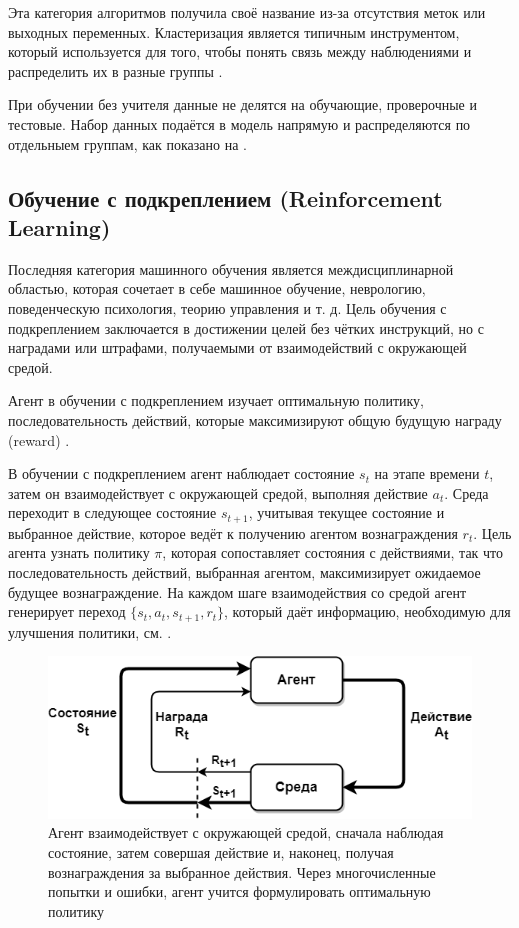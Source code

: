 Эта категория алгоритмов получила своё название из-за отсутствия меток или выходных переменных. Кластеризация является типичным инструментом, который используется для того, чтобы понять связь между наблюдениями и распределить их в разные группы \cite{hastie2001elements}.

При обучении без учителя данные не делятся на обучающие, проверочные и тестовые. Набор данных подаётся в модель напрямую и распределяются по отдельныем группам, как показано на .


\subsection{Обучение с подкреплением (Reinforcement Learning)}

Последняя категория машинного обучения является междисциплинарной областью, которая сочетает в себе машинное обучение, неврологию, поведенческую психология, теорию управления и т. д. Цель обучения с подкреплением заключается в достижении целей без чётких инструкций, но с наградами или штрафами, получаемыми от взаимодействий с окружающей средой.

Агент в обучении с подкреплением изучает оптимальную политику, последовательность действий, которые максимизируют общую будущую награду (reward) \cite{SuttonAndBarto-RL-Introduction-p2}.

В обучении с подкреплением агент наблюдает состояние ${s_t}$ на этапе времени ${t}$, затем он взаимодействует с окружающей средой, выполняя действие ${a_t}$. Среда переходит в следующее состояние ${s_{t+1}}$, учитывая текущее состояние и выбранное действие, которое ведёт к получению агентом вознаграждения ${r_t}$. Цель агента узнать политику $\pi$, которая сопоставляет состояния с действиями, так что последовательность действий, выбранная агентом, максимизирует ожидаемое будущее вознаграждение. На каждом шаге взаимодействия со средой агент генерирует переход ${\{s_t, a_t, s_{t+1}, r_t\}}$, который даёт информацию, необходимую для улучшения политики, см. .

\begin{figure}[ht!] 
	\center
	\includegraphics [scale=0.60] {my_folder/images/ch1/rl-flow.png}
	\caption{Агент взаимодействует с окружающей средой, сначала наблюдая состояние, затем совершая действие и, наконец, получая вознаграждения за выбранное действия. Через многочисленные попытки и ошибки, агент учится формулировать оптимальную политику \cite{SuttonAndBarto-RL-Introduction-p50}} 
	\label{fig:ch1-RL-flow}
\end{figure}
